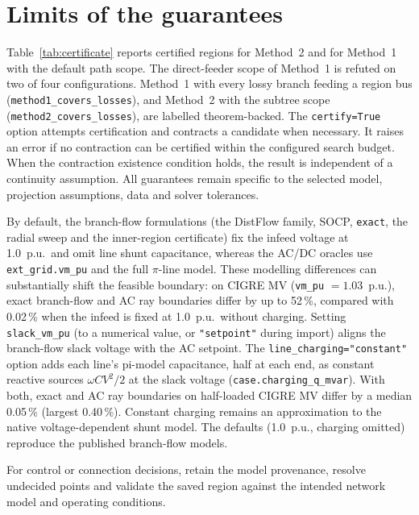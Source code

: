 \documentclass[11pt,a4paper]{report}
\newcommand{\code}[1]{\texttt{\small #1}}
\begin{document}
\clearpage
\section{Limits of the guarantees}
\label{sec:limits-guarantees}

Table~\ref{tab:certificate} reports certified regions for Method~2 and for
Method~1 with the default path scope. The direct-feeder scope of Method~1 is
refuted on two of four configurations. Method~1 with every lossy branch
feeding a region bus (\code{method1\_covers\_losses}), and Method~2 with the
subtree scope (\code{method2\_covers\_losses}), are labelled theorem-backed.
The \code{certify=True} option attempts certification and contracts a candidate
when necessary. It raises an error if no contraction can be certified within
the configured search budget. When the contraction existence condition holds, the result is
independent of a continuity assumption. All guarantees remain specific to the
selected model, projection assumptions, data and solver tolerances.

By default, the branch-flow formulations (the DistFlow family, SOCP,
\code{exact}, the radial sweep and the inner-region certificate) fix the infeed
voltage at 1.0~p.u.\ and omit line shunt capacitance, whereas the AC/DC oracles
use \code{ext\_grid.vm\_pu} and the full $\pi$-line model.
These modelling differences can substantially shift the feasible boundary: on
CIGRE MV (\code{vm\_pu} $= 1.03$~p.u.), exact branch-flow and AC ray boundaries
differ by up to 52\,\%, compared with 0.02\,\% when the infeed is fixed at
1.0~p.u.\ without charging. Setting \code{slack\_vm\_pu} (to a numerical value,
or \code{"setpoint"} during import) aligns the branch-flow slack voltage with
the AC setpoint. The \code{line\_charging="constant"} option adds each line's pi-model
capacitance, half at each end, as constant reactive sources
$\omega C V^2 / 2$ at the slack voltage (\code{case.charging\_q\_mvar}). With
both, exact and AC ray boundaries on half-loaded CIGRE MV differ by a median
0.05\,\% (largest 0.40\,\%). Constant charging remains an approximation
to the native voltage-dependent shunt model. The defaults (1.0~p.u., charging
omitted) reproduce the published branch-flow models.

\begin{warnbox}
For control or connection decisions, retain the model provenance, resolve
undecided points and validate the saved region against the intended network
model and operating conditions.
\end{warnbox}
\end{document}
